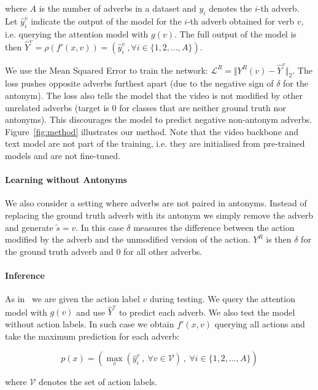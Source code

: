 \documentclass[10pt,twocolumn,letterpaper]{article}
\newcommand{\fparagraph}[1]{\paragraph{#1}}
\begin{document}
\noindent where $A$ is the number of adverbs in a dataset and $y_i$ denotes the $i$-th adverb. 
Let $\hat{y}_i^v$ indicate the output of the model for the $i$-th adverb obtained for verb $v$, i.e. querying the attention model with $g(v)$.
The full output of the model is then $\hat{Y}^v = \rho (f'(x, v)) = (\hat{y}_i^v \ , \forall i \in \{1, 2, \dots, A\})$. 

We use the Mean Squared Error to train the network: $\mathcal{L}^{R} = \Vert Y^{R}(v) - \hat{Y}^v \Vert _2$.
The loss pushes opposite adverbs furthest apart (due to the negative sign of $\delta$ for the antonym). 
The loss also tells the model that the video is not modified by other unrelated adverbs (target is 0 for classes that are neither ground truth nor antonyms). This discourages the model to predict negative non-antonym adverbs.
Figure~\ref{fig:method} illustrates our method. Note that the video backbone and text model are not part of the training, i.e. they are 
initialised from pre-trained models and are not fine-tuned.

\vspace{-10pt}

\fparagraph{Learning without Antonyms} We also consider a setting where adverbs are not paired in antonyms. Instead of replacing the ground truth 
adverb with its antonym we simply remove the adverb and generate $\tilde{s} = v$. In this case $\delta$ measures the difference between the action modified by the adverb and the unmodified version of the action. $Y^R$ is then $\delta$ for the ground truth adverb and 0 for all other adverbs. 

\vspace{-10pt}

\fparagraph{Inference} As in~\cite{doughty2020action} we are given the action label $v$ during testing. We query the attention model with $g(v)$ and use $\hat{Y}^v$ 
to predict 
each adverb.
We also test the model without action labels. 
In such case we obtain $f'(x, v)$
querying all actions 
and take the maximum prediction for each adverb: 

\vspace{-10pt}
\begin{equation}
p(x) = (\max\limits_{v}(\hat{y}_i^v \ , \ \forall v \in \mathcal{V})\ , \ \forall i \in \{1,2,\dots,A\})
\end{equation}


\noindent where $\mathcal{V}$ denotes the set of action labels. 
\end{document}
